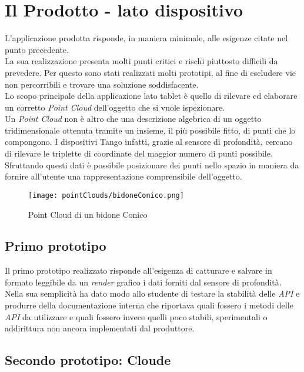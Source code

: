 \section{Il Prodotto - lato dispositivo}
L'applicazione prodotta risponde, in maniera minimale, alle esigenze citate nel punto precedente.\\
La sua realizzazione presenta molti punti critici e rischi piuttosto difficili da prevedere. Per questo sono stati realizzati molti prototipi, al fine di escludere vie non percorribili e trovare una soluzione soddisfacente.\\
Lo scopo principale della applicazione lato tablet è quello di rilevare ed elaborare un corretto \emph{Point Cloud} dell'oggetto che si vuole ispezionare.\\
Un \emph{Point Cloud} non è altro che una descrizione algebrica di un oggetto tridimensionale ottenuta tramite un insieme, il più possibile fitto, di punti che lo compongono. I dispositivi Tango infatti, grazie al sensore di profondità, cercano di rilevare le triplette di coordinate del maggior numero di punti possibile. Sfruttando questi dati è possibile posizionare dei punti nello spazio in maniera da fornire all'utente una rappresentazione comprensibile dell'oggetto.
\begin{figure}[!h] 
    \centering 
    \texttt{[image: pointClouds/bidoneConico.png]} 
    \caption{Point Cloud di un bidone Conico}
\end{figure}


\subsection{Primo prototipo}
Il primo prototipo realizzato risponde all'esigenza di catturare e salvare in formato leggibile da un \emph{render} grafico i dati forniti dal sensore di profondità.
Nella sua semplicità ha dato modo allo studente di testare la stabilità delle \emph{API} e produrre della documentazione interna che riportava quali fossero i metodi delle \emph{API} da utilizzare e quali fossero invece quelli poco stabili, sperimentali o addirittura non ancora implementati dal produttore.

\subsection{Secondo prototipo: Cloude}
